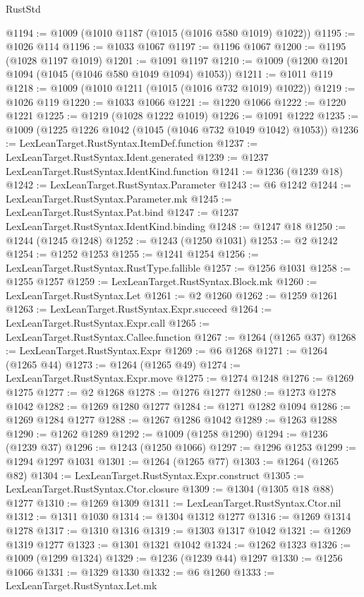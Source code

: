 \begin{lexlean}{RustStd}
\begin{coremodule}
@1194 := @1009 (@1010 @1187 (@1015 (@1016 @580 @1019) @1022))
@1195 := @1026 @114
@1196 := @1033 @1067
@1197 := @1196 @1067
@1200 := @1195 (@1028 @1197 @1019)
@1201 := @1091 @1197
@1210 := @1009 (@1200 @1201 @1094 (@1045 (@1046 @580 @1049 @1094) @1053))
@1211 := @1011 @119
@1218 := @1009 (@1010 @1211 (@1015 (@1016 @732 @1019) @1022))
@1219 := @1026 @119
@1220 := @1033 @1066
@1221 := @1220 @1066
@1222 := @1220 @1221
@1225 := @1219 (@1028 @1222 @1019)
@1226 := @1091 @1222
@1235 := @1009 (@1225 @1226 @1042 (@1045 (@1046 @732 @1049 @1042) @1053))
@1236 := LexLeanTarget.RustSyntax.ItemDef.function
@1237 := LexLeanTarget.RustSyntax.Ident.generated
@1239 := @1237 LexLeanTarget.RustSyntax.IdentKind.function
@1241 := @1236 (@1239 @18)
@1242 := LexLeanTarget.RustSyntax.Parameter
@1243 := @6 @1242
@1244 := LexLeanTarget.RustSyntax.Parameter.mk
@1245 := LexLeanTarget.RustSyntax.Pat.bind
@1247 := @1237 LexLeanTarget.RustSyntax.IdentKind.binding
@1248 := @1247 @18
@1250 := @1244 (@1245 @1248)
@1252 := @1243 (@1250 @1031)
@1253 := @2 @1242
@1254 := @1252 @1253
@1255 := @1241 @1254
@1256 := LexLeanTarget.RustSyntax.RustType.fallible
@1257 := @1256 @1031
@1258 := @1255 @1257
@1259 := LexLeanTarget.RustSyntax.Block.mk
@1260 := LexLeanTarget.RustSyntax.Let
@1261 := @2 @1260
@1262 := @1259 @1261
@1263 := LexLeanTarget.RustSyntax.Expr.succeed
@1264 := LexLeanTarget.RustSyntax.Expr.call
@1265 := LexLeanTarget.RustSyntax.Callee.function
@1267 := @1264 (@1265 @37)
@1268 := LexLeanTarget.RustSyntax.Expr
@1269 := @6 @1268
@1271 := @1264 (@1265 @44)
@1273 := @1264 (@1265 @49)
@1274 := LexLeanTarget.RustSyntax.Expr.move
@1275 := @1274 @1248
@1276 := @1269 @1275
@1277 := @2 @1268
@1278 := @1276 @1277
@1280 := @1273 @1278 @1042
@1282 := @1269 @1280 @1277
@1284 := @1271 @1282 @1094
@1286 := @1269 @1284 @1277
@1288 := @1267 @1286 @1042
@1289 := @1263 @1288
@1290 := @1262 @1289
@1292 := @1009 (@1258 @1290)
@1294 := @1236 (@1239 @37)
@1296 := @1243 (@1250 @1066)
@1297 := @1296 @1253
@1299 := @1294 @1297 @1031
@1301 := @1264 (@1265 @77)
@1303 := @1264 (@1265 @82)
@1304 := LexLeanTarget.RustSyntax.Expr.construct
@1305 := LexLeanTarget.RustSyntax.Ctor.closure
@1309 := @1304 (@1305 @18 @88) @1277
@1310 := @1269 @1309
@1311 := LexLeanTarget.RustSyntax.Ctor.nil
@1312 := @1311 @1030
@1314 := @1304 @1312 @1277
@1316 := @1269 @1314 @1278
@1317 := @1310 @1316
@1319 := @1303 @1317 @1042
@1321 := @1269 @1319 @1277
@1323 := @1301 @1321 @1042
@1324 := @1262 @1323
@1326 := @1009 (@1299 @1324)
@1329 := @1236 (@1239 @44) @1297
@1330 := @1256 @1066
@1331 := @1329 @1330
@1332 := @6 @1260
@1333 := LexLeanTarget.RustSyntax.Let.mk

\end{coremodule}
\end{lexlean}
